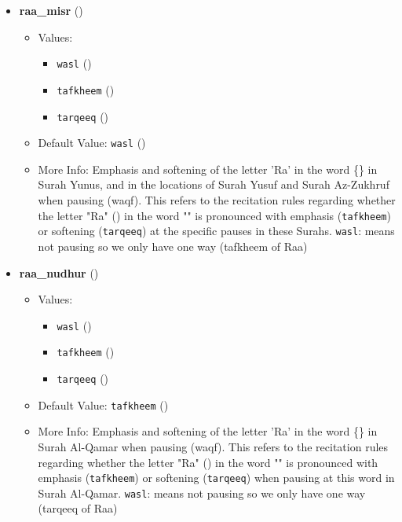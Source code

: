 \begin{itemize}
\item \textbf{raa\_misr} ()
  \begin{itemize}
  \item Values: 
    \begin{itemize}
    \item  \texttt{wasl} ()
    \item  \texttt{tafkheem} ()
    \item  \texttt{tarqeeq} ()
    \end{itemize}
  \item Default Value: \texttt{wasl} ()
  \item More Info: Emphasis and softening of the letter 'Ra' in the word \{\} in Surah Yunus, and in the locations of Surah Yusuf and Surah Az-Zukhruf when pausing (waqf). This refers to the recitation rules regarding whether the letter "Ra" () in the word "" is pronounced with emphasis (\texttt{tafkheem}) or softening (\texttt{tarqeeq}) at the specific pauses in these Surahs. \texttt{wasl}: means not pausing so we only have one way (tafkheem of Raa)
  \end{itemize}

\item \textbf{raa\_nudhur} ()
  \begin{itemize}
  \item Values: 
    \begin{itemize}
    \item  \texttt{wasl} ()
    \item  \texttt{tafkheem} ()
    \item  \texttt{tarqeeq} ()
    \end{itemize}
  \item Default Value: \texttt{tafkheem} ()
  \item More Info: Emphasis and softening of the letter 'Ra' in the word \{\} in Surah Al-Qamar when pausing (waqf). This refers to the recitation rules regarding whether the letter "Ra" () in the word "" is pronounced with emphasis (\texttt{tafkheem}) or softening (\texttt{tarqeeq}) when pausing at this word in Surah Al-Qamar. \texttt{wasl}: means not pausing so we only have one way (tarqeeq of Raa)
  \end{itemize}


\end{itemize}
